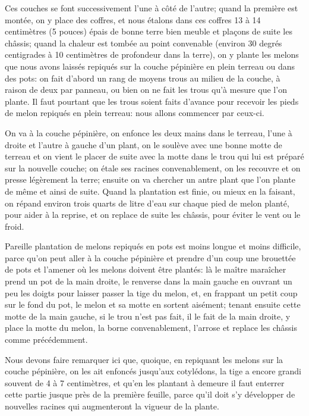 \documentclass[10pt,a4paper]{book}
\begin{document}
Ces couches se font successivement l'une à côté de l'autre; quand la première est montée, on y place des coffres, et nous étalons dans ces coffres 13 à 14 centimètres (5 pouces) épais de bonne terre bien meuble et plaçons de suite les châssis; quand la chaleur est tombée au point convenable (environ 30 degrés centigrades à 10 centimètres de profondeur dans la terre), on y plante les melons que nous avons laissés repiqués sur la couche pépinière en plein terreau ou dans des pots: on fait d'abord un rang de moyens trous au milieu de la couche, à raison de deux par panneau, ou bien on ne fait les trous qu'à mesure que l'on plante. Il faut pourtant que les trous soient faits d'avance pour recevoir les pieds de melon repiqués en plein terreau: nous allons commencer par ceux-ci.

On va à la couche pépinière, on enfonce les deux mains dans le terreau, l'une à droite et l'autre à gauche d'un plant, on le soulève avec une bonne motte de terreau et on vient le placer de suite avec la motte dans le trou qui lui est préparé sur la nouvelle couche; on étale ses racines convenablement, on les recouvre et on presse légèrement la terre; ensuite on va chercher un antre plant que l'on plante de même et ainsi de suite. Quand la plantation est finie, ou mieux en la faisant, on répand environ trois quarts de litre d'eau sur chaque pied de melon planté, pour aider à la reprise, et on replace de suite les châssis, pour éviter le vent ou le froid.

Pareille plantation de melons repiqués en pots est moins longue et moins difficile, parce qu'on peut aller à la couche pépinière et prendre d'un coup une brouettée de pots et l'amener où les melons doivent être plantés: là le maître maraîcher prend un pot de la main droite, le renverse dans la main gauche en ouvrant un peu les doigts pour laisser passer la tige du melon, et, en frappant un petit coup sur le fond du pot, le melon et sa motte en sortent aisément; tenant ensuite cette motte de la main gauche, si le trou n'est pas fait, il le fait de la main droite, y place la motte du melon, la borne convenablement, l'arrose et replace les châssis comme précédemment.

Nous devons faire remarquer ici que, quoique, en repiquant les melons sur la couche pépinière, on les ait enfoncés jusqu'aux cotylédons, la tige a encore grandi souvent de 4 à 7 centimètres, et qu'en les plantant à demeure il faut enterrer cette partie jusque près de la première feuille, parce qu'il doit s'y développer de nouvelles racines qui augmenteront la vigueur de la plante.
\end{document}
